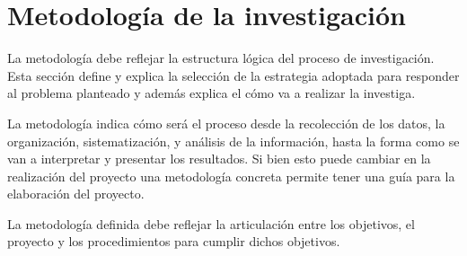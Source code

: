\section{Metodología de la investigación}
La metodología debe reflejar la estructura lógica del proceso de investigación. Esta sección define y explica la selección de la estrategia adoptada para responder al problema planteado y además explica el cómo va a realizar la investiga. 

La metodología indica cómo será el proceso desde la recolección de los datos, la organización, sistematización, y análisis de la información, hasta la forma como se van a interpretar y presentar los resultados.   Si bien esto puede cambiar en la realización del proyecto una metodología concreta permite tener una guía para la elaboración del proyecto. 

La metodología definida debe reflejar la articulación entre los objetivos, el proyecto y los procedimientos para cumplir dichos objetivos. 

